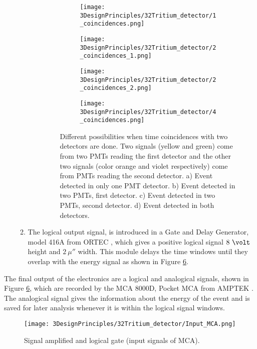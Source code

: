 \begin{enumerate}
\begin{enumerate}
\begin{enumerate}
\begin{figure}
\centering
    \begin{subfigure}[b]{0.45\textwidth}
    \centering
    \texttt{[image: 3DesignPrinciples/32Tritium\_detector/1\_coincidences.png]}  
    \caption{\label{subfig:signalInOnePMT}}
    \end{subfigure}
    \hfill
    \begin{subfigure}[b]{0.45\textwidth}
    \centering
    \texttt{[image: 3DesignPrinciples/32Tritium\_detector/2\_coincidences\_1.png]}  
    \caption{\label{subfig:signalInTwoPMTOneDetector}}
    \end{subfigure}
    \hfill
    \begin{subfigure}[b]{0.45\textwidth}
    \centering
    \texttt{[image: 3DesignPrinciples/32Tritium\_detector/2\_coincidences\_2.png]}  
    \caption{\label{subfig:signalInTwoPMTOtherDetector}}
    \end{subfigure}
    \hfill
    \begin{subfigure}[b]{0.45\textwidth}
    \centering
    \texttt{[image: 3DesignPrinciples/32Tritium\_detector/4\_coincidences.png]}  
    \caption{\label{subfig:signalInAllPMTsBothDetector}}
    \end{subfigure}
 \caption{Different possibilities when time coincidences with two detectors are done. Two signals (yellow and green) come from two PMTs reading the first detector and the other two signals (color orange and violet respectively) come from PMTs reading the second detector. a) Event detected in only one PMT detector. b) Event detected in two PMTs, first detector. c) Event detected in two PMTs, second detector. d) Event detected in both detectors.}
 \label{fig:DifferentCoincidences}
\end{figure}

\end{enumerate}

\item{} The logical output signal, is introduced in a Gate and Delay Generator, model 416A from ORTEC \cite{DataSheetGateAndDelay}, which gives a positive logical signal $8~\volt$ height and $2~\mu\second$ width. This module delays the time windows until they overlap with the energy signal as shown in Figure \ref{fig:InputSignalsMCA}.

\end{enumerate}

\end{enumerate}

The final output of the electronics are a logical and analogical signals, shown in Figure \ref{fig:InputSignalsMCA}, which are recorded by the MCA 8000D, Pocket MCA from AMPTEK \cite{DataSheetMCA}. The analogical signal gives the information about the energy of the event and is saved for later analysis whenever it is within the logical signal windows.

\begin{figure}[htbp]
\centering
\texttt{[image: 3DesignPrinciples/32Tritium\_detector/Input\_MCA.png]}
\caption{Signal amplified and logical gate (input signals of MCA).\label{fig:InputSignalsMCA}}
\end{figure}